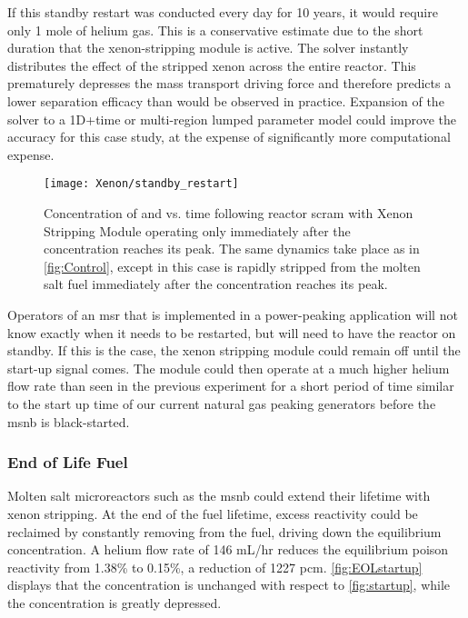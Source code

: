 If this standby restart was conducted every day for 10 years, it would require only 1 mole of helium gas. This is a conservative estimate due to the short duration that the xenon-stripping module is active. The solver instantly distributes the effect of the stripped xenon across the entire reactor. This prematurely depresses the mass transport driving force and therefore predicts a lower separation efficacy than would be observed in practice. Expansion of the solver to a 1D+time or multi-region lumped parameter model could improve the accuracy for this case study, at the expense of significantly more computational expense.

\begin{figure}[ht!]
    \centering
    \texttt{[image: Xenon/standby\_restart]}
    \caption[Concentration of \I and \Xe vs. time following reactor scram - Standby Mode]{Concentration of \I and \Xe vs. time following reactor scram with Xenon Stripping Module operating only immediately after the \Xe concentration reaches its peak. The same dynamics take place as in \cref{fig:Control}, except in this case \Xe is rapidly stripped from the molten salt fuel immediately after the \Xe concentration reaches its peak.}
    \label{fig:Standby}
\end{figure}

Operators of an \acs{msr} that is implemented in a power-peaking application will not know exactly when it needs to be restarted, but will need to have the reactor on standby. If this is the case, the xenon stripping module could remain off until the start-up signal comes. The module could then operate at a much higher helium flow rate than seen in the previous experiment for a short period of time similar to the start up time of our current natural gas peaking generators \cite{GE} before the \acs{msnb} is black-started. 

\subsubsection{End of Life Fuel}\label{sec-EOL}
 Molten salt microreactors such as the \acs{msnb} could extend their lifetime with xenon stripping. At the end of the fuel lifetime, excess reactivity could be reclaimed by constantly removing \Xe from the fuel, driving down the equilibrium concentration. A helium flow rate of 146 mL/hr reduces the equilibrium poison reactivity from 1.38\% to 0.15\%, a reduction of 1227 pcm. \cref{fig:EOLstartup} displays that the \I concentration is unchanged with respect to \cref{fig:startup}, while the \Xe concentration is greatly depressed. 
 
